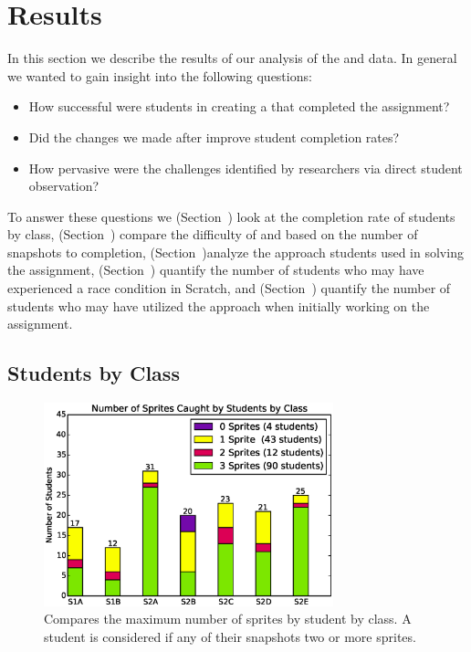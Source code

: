 \section{Results}
In this section we describe the results of our analysis of the \sone{} and
\stwo{} data. In general we wanted to gain insight into the following
questions:

\begin{itemize}
\item How successful were students in creating a \sprogram{} that completed the
  assignment?
\item Did the changes we made after \sone{} improve student completion rates?
\item How pervasive were the challenges identified by researchers via direct
  student observation?
\end{itemize}

To answer these questions we (Section~) look at the
completion rate of students by class, (Section~)
compare the difficulty of \sone{} and \stwo{} based on the number of snapshots
to completion, (Section~)analyze the approach students
used in solving the assignment, (Section~) quantify the
number of students who may have experienced a race condition in Scratch, and
(Section~) quantify the number of students who may have
utilized the \dce{} approach when initially working on the assignment.


\subsection{Students by Class}

\begin{figure}[!t]
\centering
\includegraphics[width=3.3in]{graphs/by_class_students.eps}
\caption{Compares the maximum number of sprites \caught{} by student by
  class. A student is considered \com{} if any of their snapshots 
  two or more sprites.}
\end{figure}

